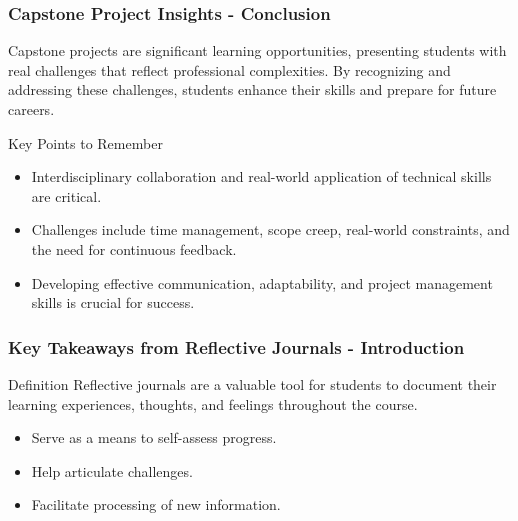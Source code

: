 \documentclass{beamer}
\begin{document}
\begin{frame}[fragile]
    \frametitle{Capstone Project Insights - Conclusion}
    Capstone projects are significant learning opportunities, presenting students with real challenges that reflect professional complexities. By recognizing and addressing these challenges, students enhance their skills and prepare for future careers.
    
    \begin{block}{Key Points to Remember}
        \begin{itemize}
            \item Interdisciplinary collaboration and real-world application of technical skills are critical.
            \item Challenges include time management, scope creep, real-world constraints, and the need for continuous feedback.
            \item Developing effective communication, adaptability, and project management skills is crucial for success.
        \end{itemize}
    \end{block}
\end{frame}

\begin{frame}[fragile]
    \frametitle{Key Takeaways from Reflective Journals - Introduction}
    \begin{block}{Definition}
        Reflective journals are a valuable tool for students to document their learning experiences, thoughts, and feelings throughout the course.
    \end{block}
    \begin{itemize}
        \item Serve as a means to self-assess progress.
        \item Help articulate challenges.
        \item Facilitate processing of new information.
    \end{itemize}
\end{frame}
\end{document}
